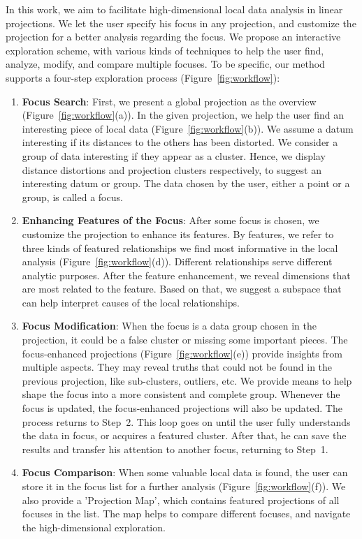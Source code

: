 In this work, we aim to facilitate high-dimensional local data analysis in linear projections. We let the user specify his focus in any projection, and customize the projection for a better analysis regarding the focus. We propose an interactive exploration scheme, with various kinds of techniques to help the user find, analyze, modify, and compare multiple focuses. To be specific, our method supports a four-step exploration process (Figure~\ref{fig:workflow}):
\begin{enumerate}[Step. 1:]
 \item \textbf{Focus Search}: First, we present a global projection as the overview (Figure~\ref{fig:workflow}(a)). In the given projection, we help the user find an interesting piece of local data (Figure~\ref{fig:workflow}(b)). We assume a datum interesting if its distances to the others has been distorted. We consider a group of data interesting if they appear as a cluster. Hence, we display distance distortions and projection clusters respectively, to suggest an interesting datum or group. The data chosen by the user, either a point or a group, is called a focus.
 \item \textbf{Enhancing Features of the Focus}: After some focus is chosen, we customize the projection to enhance its features. By features, we refer to three kinds of featured relationships we find most informative in the local analysis (Figure~\ref{fig:workflow}(d)). Different relationships serve different analytic purposes. After the feature enhancement, we reveal dimensions that are most related to the feature. Based on that, we suggest a subspace that can help interpret causes of the local relationships.
 \item \textbf{Focus Modification}: When the focus is a data group chosen in the projection, it could be a false cluster or missing some important pieces. The focus-enhanced projections (Figure~\ref{fig:workflow}(e)) provide insights from multiple aspects. They may reveal truths that could not be found in the previous projection, like sub-clusters, outliers, etc. We provide means to help shape the focus into a more consistent and complete group. Whenever the focus is updated, the focus-enhanced projections will also be updated. The process returns to Step~2. This loop goes on until the user fully understands the data in focus, or acquires a featured cluster. After that, he can save the results and transfer his attention to another focus, returning to Step~1.
 \item \textbf{Focus Comparison}: When some valuable local data is found, the user can store it in the focus list for a further analysis (Figure~\ref{fig:workflow}(f)). We also provide a 'Projection Map', which contains featured projections of all focuses in the list. The map helps to compare different focuses, and navigate the high-dimensional exploration.
\end{enumerate}
